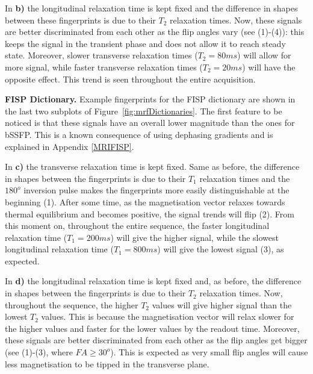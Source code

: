 \hfill

In \textbf{b)} the longitudinal relaxation time is kept fixed and the difference in shapes between these fingerprints is due to their $T_2$ relaxation times.
Now, these signals are better discriminated from each other as the flip angles vary (see (1)-(4)): this keeps the signal in the transient phase and does not allow it to reach steady state.
Moreover, slower transverse relaxation times ($T_2 = 80ms$) will allow for more signal, while faster transverse relaxation times ($T_2 = 20ms$) will have the opposite effect.
This trend is seen throughout the entire acquisition.

\hfill

\textbf{FISP Dictionary.} 
Example fingerprints for the FISP dictionary are shown in the last two subplots of Figure~\ref{fig:mrfDictionaries}.
The first feature to be noticed is that these signals have an overall lower magnitude than the ones for bSSFP.
This is a known consequence of using dephasing gradients and is explained in Appendix \ref{MRIFISP}.

\hfill

In \textbf{c)} the transverse relaxation time is kept fixed. 
Same as before, the difference in shapes between the fingerprints is due to their $T_1$ relaxation times and the $180^o$ inversion pulse makes the fingerprints more easily distinguishable at the beginning (1).
After some time, as the magnetisation vector relaxes towards thermal equilibrium and becomes positive, the signal trends will flip (2).
From this moment on, throughout the entire sequence, the faster longitudinal relaxation time ($T_1 = 200ms$) will give the higher signal, while the slowest longitudinal relaxation time ($T_1 = 800ms$) will give the lowest signal (3), as expected.

\hfill

In \textbf{d)} the longitudinal relaxation time is kept fixed and, as before, the difference in shapes between the fingerprints is due to their $T_2$ relaxation times.
Now, throughout the sequence, the higher $T_2$ values will give higher signal than the lowest $T_2$ values.
This is because the magnetisation vector will relax slower for the higher values and faster for the lower values by the readout time.
Moreover, these signals are better discriminated from each other as the flip angles get bigger (see (1)-(3), where $FA \geq 30^o$).
This is expected as very small flip angles will cause less magnetisation to be tipped in the transverse plane.

